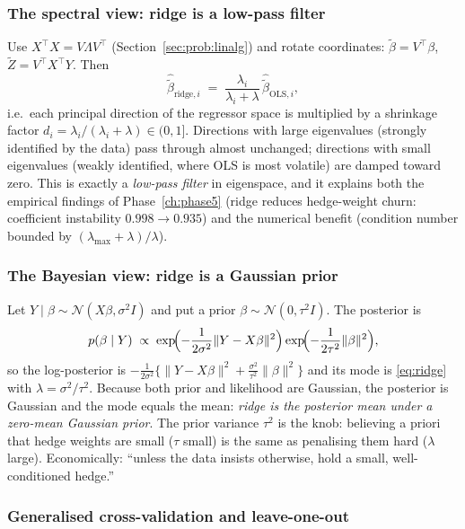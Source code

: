 \subsubsection{The spectral view: ridge is a low-pass filter}
\label{sec:ridge:spectral}

Use $X^{\top}X=V\Lambda V^{\top}$ (Section~\ref{sec:prob:linalg}) and rotate coordinates:
$\tilde\beta=V^{\top}\beta$, $\tilde Z=V^{\top}X^{\top}Y$. Then
\begin{equation}
  \hat{\tilde\beta}_{\text{ridge},i} \;=\; \frac{\lambda_i}{\lambda_i+\lambda}\,
  \hat{\tilde\beta}_{\text{OLS},i},
  \label{eq:ridge:spectral}
\end{equation}
i.e.\ each principal direction of the regressor space is multiplied by a shrinkage
factor $d_i=\lambda_i/(\lambda_i+\lambda)\in(0,1]$. Directions with large eigenvalues
(strongly identified by the data) pass through almost unchanged; directions with small
eigenvalues (weakly identified, where OLS is most volatile) are damped toward zero. This
is exactly a \emph{low-pass filter} in eigenspace, and it explains both the empirical
findings of Phase~\ref{ch:phase5} (ridge reduces hedge-weight churn: coefficient
instability $0.998\to0.935$) and the numerical benefit (condition number bounded by
$(\lambda_{\max}+\lambda)/\lambda$).

\subsubsection{The Bayesian view: ridge is a Gaussian prior}
\label{sec:ridge:bayes}

Let $Y\mid\beta\sim\mathcal N(X\beta,\sigma^2 I)$ and put a prior
$\beta\sim\mathcal N(0,\tau^2 I)$. The posterior is
\[
  p(\beta\mid Y) \;\propto\;
  \exp\!\Bigl(-\frac{1}{2\sigma^2}\lVert Y-X\beta\rVert^2\Bigr)
  \exp\!\Bigl(-\frac{1}{2\tau^2}\lVert\beta\rVert^2\Bigr),
\]
so the log-posterior is $-\frac{1}{2\sigma^2}\{\lVert Y-X\beta\rVert^2 +
\frac{\sigma^2}{\tau^2}\lVert\beta\rVert^2\}$ and its mode is
\eqref{eq:ridge} with $\lambda=\sigma^2/\tau^2$. Because both prior and likelihood are
Gaussian, the posterior is Gaussian and the mode equals the mean: \emph{ridge is the
posterior mean under a zero-mean Gaussian prior}. The prior variance $\tau^2$ is the
knob: believing a priori that hedge weights are small ($\tau$ small) is the same as
penalising them hard ($\lambda$ large). Economically: ``unless the data insists
otherwise, hold a small, well-conditioned hedge.''

\subsubsection{Generalised cross-validation and leave-one-out}
\label{sec:ridge:loo}

